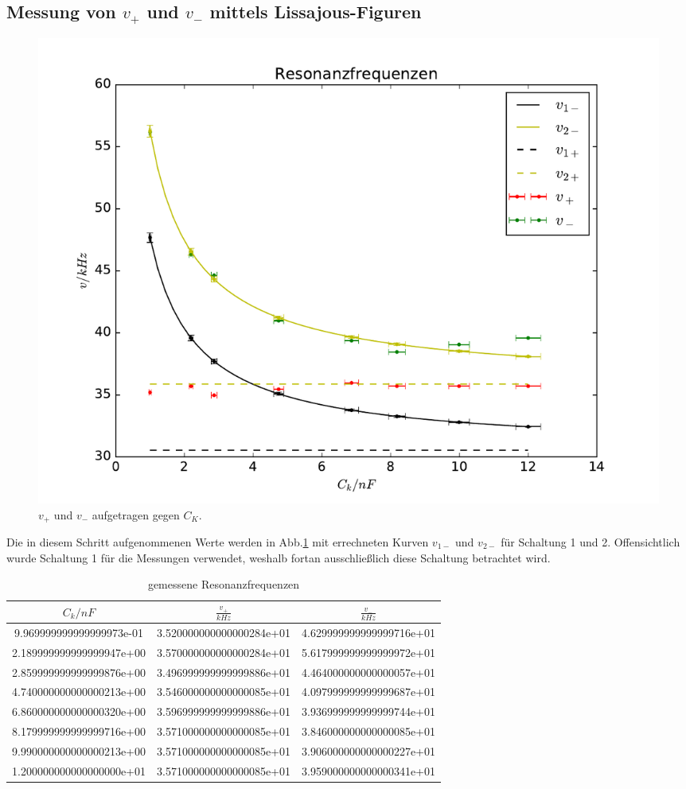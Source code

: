 \subsection{Messung von $v_+$ und $v_-$ mittels Lissajous-Figuren}
\label{sec:Messung-v}


\begin{figure}
  \centering
  \includegraphics[width=\textwidth]{./plots/resonance.pdf}
  \caption{$v_+$ und $v_-$ aufgetragen gegen $C_K$.}
  \label{fig:frequenzen}
\end{figure}
\FloatBarrier

Die in diesem Schritt aufgenommenen Werte werden in Abb.\ref{fig:frequenzen} mit errechneten Kurven $v_{1-}$ und $v_{2-}$ für Schaltung 1 und 2. Offensichtlich wurde Schaltung 1 für die Messungen verwendet, weshalb fortan ausschließlich diese Schaltung betrachtet wird.

\begin{table}
  \centering
\caption{gemessene Resonanzfrequenzen}
\label{tab:verhaeltnisse}
\begin{tabular}{S S S}
  \toprule
  {$C_k/nF$} & {$\frac{v_+}{kHz}$} & {$\frac{v_-}{kHz}$}\\
  \midrule
  9.969999999999999973e-01 & 3.520000000000000284e+01 & 4.629999999999999716e+01\\
  2.189999999999999947e+00 & 3.570000000000000284e+01 & 5.617999999999999972e+01\\
  2.859999999999999876e+00 & 3.496999999999999886e+01 & 4.464000000000000057e+01\\
  4.740000000000000213e+00 & 3.546000000000000085e+01 & 4.097999999999999687e+01\\
  6.860000000000000320e+00 & 3.596999999999999886e+01 & 3.936999999999999744e+01\\
  8.179999999999999716e+00 & 3.571000000000000085e+01 & 3.846000000000000085e+01\\
  9.990000000000000213e+00 & 3.571000000000000085e+01 & 3.906000000000000227e+01\\
  1.200000000000000000e+01 & 3.571000000000000085e+01 & 3.959000000000000341e+01\\
\bottomrule
\end{tabular}
\end{table}
\FloatBarrier


